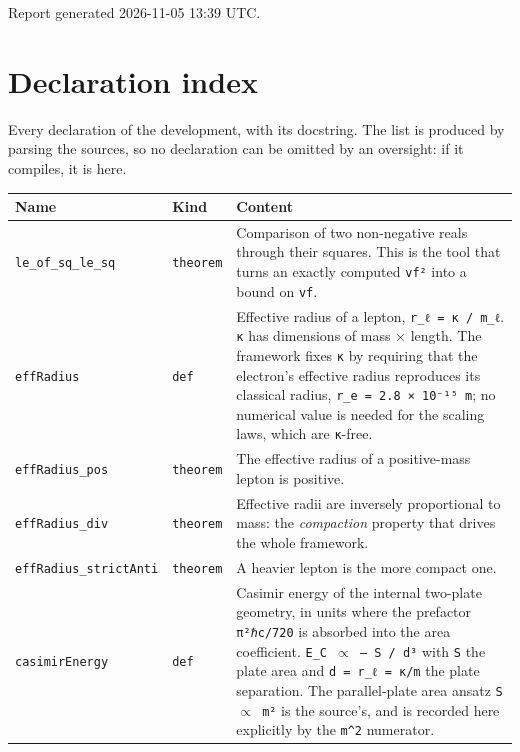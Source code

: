 \documentclass[11pt,a4paper]{article}
\begin{document}
\noindent Report generated 2026-11-05 13:39 UTC.


\clearpage
\appendix
\section{Declaration index}
\label{app:index}

Every declaration of the development, with its docstring.  The list is produced
by parsing the sources, so no declaration can be omitted by an oversight: if it
compiles, it is here.

\begin{center}\footnotesize
\begin{longtable}{@{}p{}p{}p{}@{}}
\toprule
Name & Kind & Content \\
\midrule
\endhead
\texttt{le\_\allowbreak{}of\_\allowbreak{}sq\_\allowbreak{}le\_\allowbreak{}sq} & \texttt{theorem} & \small Comparison of two non-negative reals through their squares.  This is the tool that turns an exactly computed \texttt{vf²} into a bound on \texttt{vf}. \\
\texttt{effRadius} & \texttt{def} & \small Effective radius of a lepton, \texttt{r\_\allowbreak{}ℓ = κ / m\_\allowbreak{}ℓ}. \texttt{κ} has dimensions of mass × length.  The framework fixes \texttt{κ} by requiring that the electron's effective radius reproduces its classical radius, \texttt{r\_\allowbreak{}e = 2.8 × 10⁻¹⁵ m}; no numerical value is needed for the scaling laws, which are \texttt{κ}-free. \\
\texttt{effRadius\_\allowbreak{}pos} & \texttt{theorem} & \small The effective radius of a positive-mass lepton is positive. \\
\texttt{effRadius\_\allowbreak{}div} & \texttt{theorem} & \small Effective radii are inversely proportional to mass: the \emph{compaction} property that drives the whole framework. \\
\texttt{effRadius\_\allowbreak{}strictAnti} & \texttt{theorem} & \small A heavier lepton is the more compact one. \\
\texttt{casimirEnergy} & \texttt{def} & \small Casimir energy of the internal two-plate geometry, in units where the prefactor \texttt{π²ℏc/720} is absorbed into the area coefficient. \texttt{E\_\allowbreak{}C $\propto$ --- S / d³} with \texttt{S} the plate area and \texttt{d = r\_\allowbreak{}ℓ = κ/m} the plate separation.  The parallel-plate area ansatz \texttt{S $\propto$ m²} is the source's, and is recorded here explicitly by the \texttt{m\textasciicircum{}2} numerator. \\

\end{longtable}
\end{center}
\end{document}
